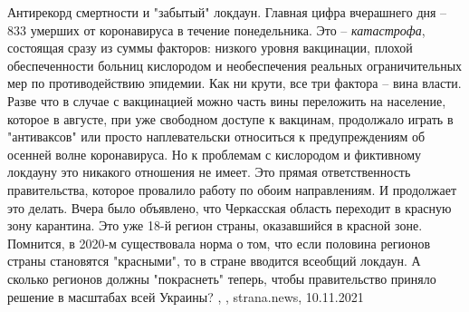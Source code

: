 Антирекорд смертности и "забытый" локдаун. Главная цифра вчерашнего дня – 833
умерших от коронавируса в течение понедельника. Это – \emph{катастрофа},
состоящая сразу из суммы факторов: низкого уровня вакцинации, плохой
обеспеченности больниц кислородом и необеспечения реальных ограничительных мер
по противодействию эпидемии.  Как ни крути, все три фактора – вина власти.
Разве что в случае с вакцинацией можно часть вины переложить на население,
которое в августе, при уже свободном доступе к вакцинам, продолжало играть в
"антиваксов" или просто наплевательски относиться к предупреждениям об осенней
волне коронавируса.  Но к проблемам с кислородом и фиктивному локдауну это
никакого отношения не имеет. Это прямая ответственность правительства, которое
провалило работу по обоим направлениям. И продолжает это делать.  Вчера было
объявлено, что Черкасская область переходит в красную зону карантина. Это уже
18-й регион страны, оказавшийся в красной зоне. Помнится, в 2020-м существовала
норма о том, что если половина регионов страны становятся "красными", то в
стране вводится всеобщий локдаун. А сколько регионов должны "покраснеть"
теперь, чтобы правительство приняло решение в масштабах всей Украины?
, 
, strana.news, 10.11.2021
